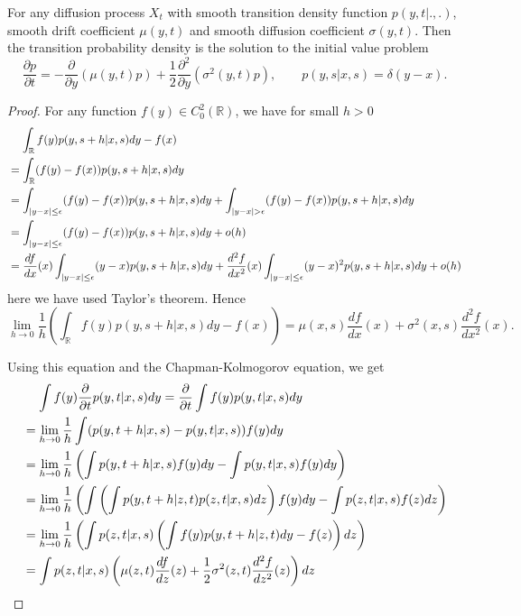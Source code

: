 \begin{theorem}[Kolmogorov] 
For any diffusion process $X_t$ with smooth transition density function
$p(y,t|.,.)$, smooth drift coefficient $\mu(y,t)$ and smooth diffusion
coefficient $\sigma(y,t)$. Then the transition probability density is the
solution to the initial value problem
\begin{equation} \label{E:kolm_forw}
  \frac{\partial p}{\partial t} = - \frac{\partial}{\partial y} (\mu(y,t) p)
    + \frac{1}{2} \frac{\partial^2}{\partial y} (\sigma^2(y,t) p),
  \qquad p(y,s|x,s)=\delta(y-x).
\end{equation}
\end{theorem}
\begin{proof}
For any function $f(y)\in C_0^2(\mathbb{R})$, we have for small $h>0$
\begin{align*}
  & \hspace{0.4cm} \int_{\mathbb{R}} f(y) p(y,s+h|x,s) dy - f(x)  \\
  &= \int_{\mathbb{R}} (f(y)-f(x)) p(y,s+h|x,s) dy  \\
  &= \int_{|y-x|\le\epsilon} (f(y)-f(x)) p(y,s+h|x,s) dy  
     + \int_{|y-x|>\epsilon} (f(y)-f(x)) p(y,s+h|x,s) dy  \\
  &= \int_{|y-x|\le\epsilon} (f(y)-f(x)) p(y,s+h|x,s) dy  + o(h) \\
  &= \frac{df}{dx}(x) \int_{|y-x|\le\epsilon} (y-x) p(y,s+h|x,s) dy  
     + \frac{d^2 f}{dx^2}(x) \int_{|y-x|\le\epsilon} (y-x)^2 p(y,s+h|x,s) dy  
     + o(h) 
\end{align*}
here we have used Taylor's theorem. Hence
\[
  \lim_{h\to 0} \frac{1}{h} \left( \int_{\mathbb{R}} f(y) p(y,s+h|x,s) dy - f(x) \right)
  = \mu(x,s) \frac{df}{dx}(x) + \sigma^2(x,s) \frac{d^2 f}{dx^2}(x).
\]

Using this equation and the Chapman-Kolmogorov equation, we get
\begin{align*}
  & \hspace{0.4cm} \int f(y) \frac{\partial}{\partial t} p(y,t|x,s) dy 
    = \frac{\partial}{\partial t} \int f(y) p(y,t|x,s) dy  \\
  &= \lim_{h\to 0} \frac{1}{h} \int (p(y,t+h|x,s)-p(y,t|x,s)) f(y) dy \\
  &= \lim_{h\to 0} \frac{1}{h} \left( \int p(y,t+h|x,s) f(y) dy - \int p(y,t|x,s) f(y)dy \right) \\
  &= \lim_{h\to 0} \frac{1}{h} \left( \int \left(\int p(y,t+h|z,t) p(z,t|x,s) dz\right) f(y) dy 
     - \int p(z,t|x,s) f(z)dz \right) \\
  &= \lim_{h\to 0} \frac{1}{h} \left( \int p(z,t|x,s) 
       \left( \int f(y) p(y,t+h|z,t) dy - f(z) \right) dz  \right) \\
  &= \int p(z,t|x,s) \left( \mu(z,t)\frac{df}{dz}(z) 
      + \frac{1}{2}\sigma^2(z,t) \frac{d^2 f}{dz^2}(z) \right) dz
\end{align*}


\end{proof}
